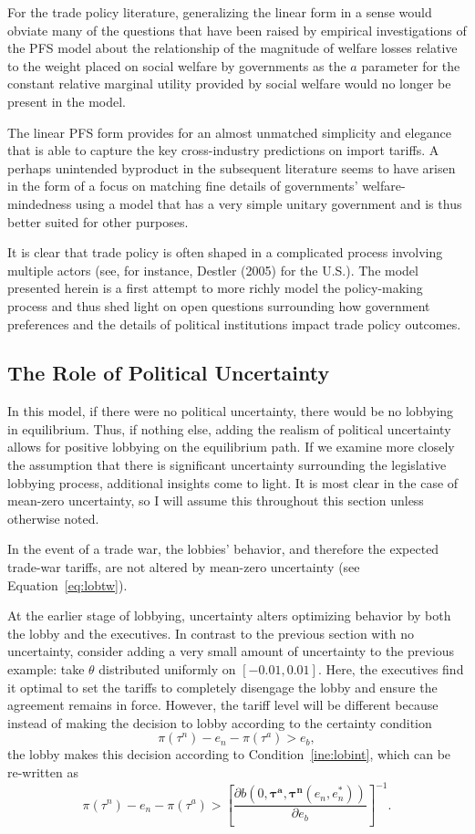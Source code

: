 \documentclass[10pt]{article}
\newcommand{\ve}{\theta}
\newcommand{\bta}{\bm{\tau^a}}
\newcommand{\btn}{\bm{\tau^n}}
\begin{document}
For the trade policy literature, generalizing the linear form in a sense would obviate many of the questions that have been raised by empirical investigations of the PFS model about the relationship of the magnitude of welfare losses relative to the weight placed on social welfare by governments as the $a$ parameter for the constant relative marginal utility provided by social welfare would no longer be present in the model.

The linear PFS form provides for an almost unmatched simplicity and elegance that is able to capture the key cross-industry predictions on import tariffs. A perhaps unintended byproduct in the subsequent literature seems to have arisen in the form of a focus on matching fine details of governments' welfare-mindedness using a model that has a very simple unitary government and is thus better suited for other purposes.

It is clear that trade policy is often shaped in a complicated process involving multiple actors (see, for instance, Destler (2005) for the U.S.). The model presented herein is a first attempt to more richly model the policy-making process and thus shed light on open questions surrounding how government preferences and the details of political institutions impact trade policy outcomes.


\subsection{The Role of Political Uncertainty}
\label{sec:uncertainty}
In this model, if there were no political uncertainty, there would be no lobbying in equilibrium. Thus, if nothing else, adding the realism of political uncertainty allows for positive lobbying on the equilibrium path. If we examine more closely the assumption that there is significant uncertainty surrounding the legislative lobbying process, additional insights come to light. It is most clear in the case of mean-zero uncertainty, so I will assume this throughout this section unless otherwise noted.

In the event of a trade war, the lobbies' behavior, and therefore the expected trade-war tariffs, are not altered by mean-zero uncertainty (see Equation~\ref{eq:lobtw}).

At the earlier stage of lobbying, uncertainty alters optimizing behavior by both the lobby and the executives. In contrast to the previous section with no uncertainty, consider adding a very small amount of uncertainty to the previous example: take $\ve$ distributed uniformly on $[-0.01,0.01]$. Here, the executives find it optimal to set the tariffs to completely disengage the lobby and ensure the agreement remains in force. However, the tariff level will be different because instead of making the decision to lobby according to the certainty condition
\[\pi(\tau^n) - e_n - \pi(\tau^a) > e_b,
\]
the lobby makes this decision according to Condition~\ref{ine:lobint}, which can be re-written as
\[
\pi(\tau^n) - e_n - \pi(\tau^a) > \left[\frac{\partial b(0,\bta,\btn(e_n,e_n^*))}{\partial e_b}\right]^{-1}.
\]
\end{document}
